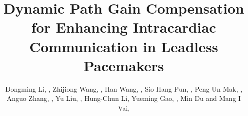 \documentclass[journal]{IEEEtran}
\begin{document}
\title{Dynamic Path Gain Compensation for Enhancing Intracardiac Communication in Leadless Pacemakers}

\author{
  Dongming Li, ,
 Zhijiong Wang, ,
  Han Wang, ,
  Sio Hang Pun, ,
  Peng Un Mak, ,
  Anguo Zhang, ,
  Yu Liu, ,
  Hung-Chun Li,
  Yueming Gao, ,
  Min Du and Mang I Vai, 

}


\maketitle

\begin{abstract}
\end{abstract}
\end{document}
